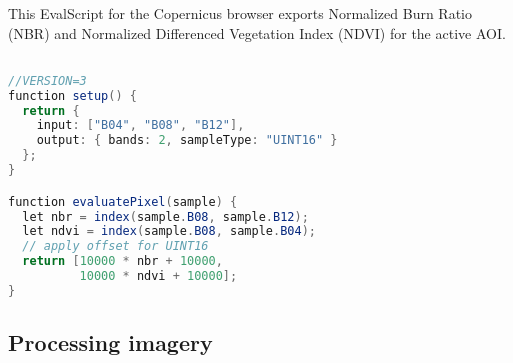 \documentclass[
]{article}
\newenvironment{Shaded}{\begin{snugshade}}{\end{snugshade}}
\newcommand{\AttributeTok}[1]{\textcolor[rgb]{0.13,0.29,0.53}{#1}}
\newcommand{\ConstantTok}[1]{\textcolor[rgb]{0.56,0.35,0.01}{#1}}
\newcommand{\ControlFlowTok}[1]{\textcolor[rgb]{0.13,0.29,0.53}{\textbf{#1}}}
\newcommand{\DecValTok}[1]{\textcolor[rgb]{0.00,0.00,0.81}{#1}}
\newcommand{\FunctionTok}[1]{\textcolor[rgb]{0.13,0.29,0.53}{\textbf{#1}}}
\newcommand{\NormalTok}[1]{#1}
\newcommand{\OtherTok}[1]{\textcolor[rgb]{0.56,0.35,0.01}{#1}}
\newcommand{\SpecialCharTok}[1]{\textcolor[rgb]{0.81,0.36,0.00}{\textbf{#1}}}
\newcommand{\StringTok}[1]{\textcolor[rgb]{0.31,0.60,0.02}{#1}}
\begin{document}
\begin{Shaded}
\end{Shaded}

This EvalScript for the Copernicus browser exports Normalized Burn Ratio
(NBR) and Normalized Differenced Vegetation Index (NDVI) for the active
AOI.

\begin{lstlisting}[language=Java]

//VERSION=3
function setup() {
  return {
    input: ["B04", "B08", "B12"],
    output: { bands: 2, sampleType: "UINT16" }
  };
}

function evaluatePixel(sample) {
  let nbr = index(sample.B08, sample.B12);
  let ndvi = index(sample.B08, sample.B04);
  // apply offset for UINT16 
  return [10000 * nbr + 10000, 
          10000 * ndvi + 10000]; 
}
\end{lstlisting}

\subsection{Processing imagery}\label{processing-imagery}
\end{document}
